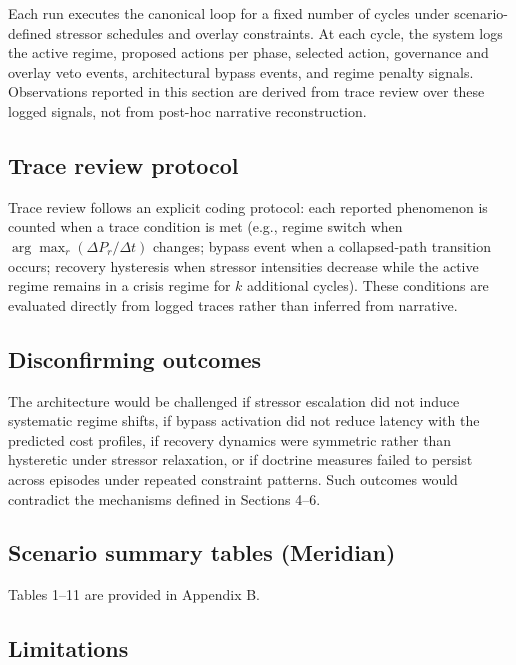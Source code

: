 \documentclass[11pt,a4paper]{article}
\begin{document}
Each run executes the canonical loop for a fixed number of cycles under scenario-defined stressor schedules and overlay constraints. At each cycle, the system logs the active regime, proposed actions per phase, selected action, governance and overlay veto events, architectural bypass events, and regime penalty signals. Observations reported in this section are derived from trace review over these logged signals, not from post-hoc narrative reconstruction.

\subsection{Trace review protocol}

Trace review follows an explicit coding protocol: each reported phenomenon is counted when a trace condition is met (e.g., regime switch when $\arg\max_r (\Delta P_r/\Delta t)$ changes; bypass event when a collapsed-path transition occurs; recovery hysteresis when stressor intensities decrease while the active regime remains in a crisis regime for $k$ additional cycles). These conditions are evaluated directly from logged traces rather than inferred from narrative.

\subsection{Disconfirming outcomes}

The architecture would be challenged if stressor escalation did not induce systematic regime shifts, if bypass activation did not reduce latency with the predicted cost profiles, if recovery dynamics were symmetric rather than hysteretic under stressor relaxation, or if doctrine measures failed to persist across episodes under repeated constraint patterns. Such outcomes would contradict the mechanisms defined in Sections 4--6.

\subsection{Scenario summary tables (Meridian)}

Tables 1--11 are provided in Appendix B.

\subsection{Limitations}
\end{document}
